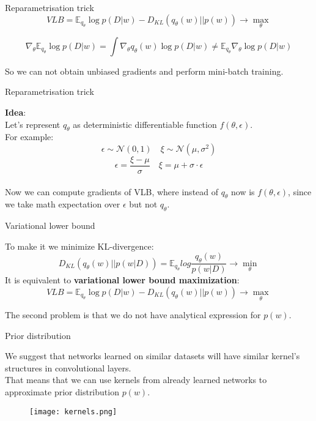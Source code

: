 \documentclass[19pt]{beamer}
\begin{document}
\begin{frame}{Reparametrisation trick}
$$
VLB = \mathbb{E}_{q_{\theta}} \log p(D \vert w) - D_{KL}(q_{\theta}(w) \vert \vert p(w)) \rightarrow \max_{\theta}
$$

$$ 
\nabla_{\theta} \mathbb{E}_{q_{\theta}} \log p(D| w) = \int \nabla_{\theta} q_{\theta}(w) \log p(D \vert w)  \neq \mathbb{E}_{q_{\theta}} \nabla_{\theta} \log p(D \vert w)
$$

So we can not obtain unbiased gradients and perform mini-batch training. \\

\end{frame}

\begin{frame}{Reparametrisation trick}

\textbf{Idea}:\\

Let's represent $q_{\theta}$ as deterministic differentiable function $f(\theta, \epsilon)$.\\
For example:\\
$$
\epsilon \sim \mathcal{N}(0, 1) \quad
\xi \sim \mathcal{N}(\mu, \sigma^{2})
$$
$$
\epsilon = \frac{\xi - \mu}{\sigma} \quad \xi = \mu + \sigma \cdot \epsilon 
$$
\\
Now we can compute gradients of VLB, where instead of $q_{\theta}$ now is $f(\theta, \epsilon)$, since we take math expectation over $\epsilon$ but not $q_{\theta}$.

\end{frame}

\begin{frame}{Variational lower bound}

To make it we minimize KL-divergence:\\
$$
D_{KL}(q_{\theta}(w) \vert \vert p(w \vert D)) = \mathbb{E}_{q_{\theta}}log\frac{q_{\theta}(w)}{p(w \vert  D)} \rightarrow \min_{\theta}
$$ 
It is equivalent to \textbf{variational lower bound maximization}:
$$
VLB = \mathbb{E}_{q_{\theta}} \log p(D \vert w) - D_{KL}(q_{\theta}(w) \vert \vert p(w)) \rightarrow \max_{\theta}
$$

The second problem is that we do not have analytical expression for $p(w)$.
\end{frame}

\begin{frame}{Prior distribution}

We suggest that networks learned on similar datasets will have similar kernel's structures in convolutional layers.\\
That means that we can use kernels from already learned networks to approximate prior distribution $p(w)$.\\

\begin{figure}
    \centering
    \texttt{[image: kernels.png]}
    \label{fig:my_label}
\end{figure}

\end{frame}
\end{document}
